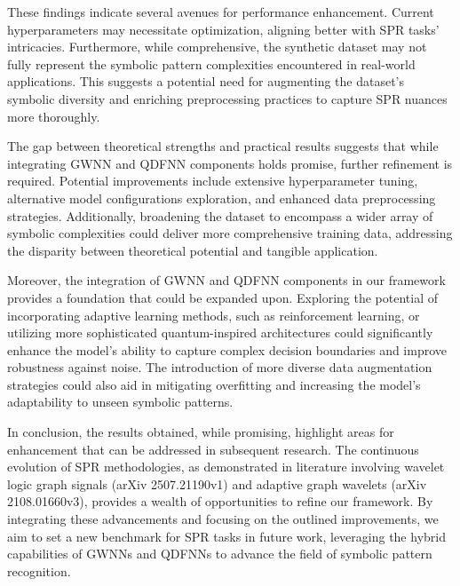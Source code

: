 \documentclass{article}
\begin{document}
These findings indicate several avenues for performance enhancement. Current hyperparameters may necessitate optimization, aligning better with SPR tasks' intricacies. Furthermore, while comprehensive, the synthetic dataset may not fully represent the symbolic pattern complexities encountered in real-world applications. This suggests a potential need for augmenting the dataset's symbolic diversity and enriching preprocessing practices to capture SPR nuances more thoroughly.

The gap between theoretical strengths and practical results suggests that while integrating GWNN and QDFNN components holds promise, further refinement is required. Potential improvements include extensive hyperparameter tuning, alternative model configurations exploration, and enhanced data preprocessing strategies. Additionally, broadening the dataset to encompass a wider array of symbolic complexities could deliver more comprehensive training data, addressing the disparity between theoretical potential and tangible application.

Moreover, the integration of GWNN and QDFNN components in our framework provides a foundation that could be expanded upon. Exploring the potential of incorporating adaptive learning methods, such as reinforcement learning, or utilizing more sophisticated quantum-inspired architectures could significantly enhance the model's ability to capture complex decision boundaries and improve robustness against noise. The introduction of more diverse data augmentation strategies could also aid in mitigating overfitting and increasing the model's adaptability to unseen symbolic patterns.

In conclusion, the results obtained, while promising, highlight areas for enhancement that can be addressed in subsequent research. The continuous evolution of SPR methodologies, as demonstrated in literature involving wavelet logic graph signals (arXiv 2507.21190v1) and adaptive graph wavelets (arXiv 2108.01660v3), provides a wealth of opportunities to refine our framework. By integrating these advancements and focusing on the outlined improvements, we aim to set a new benchmark for SPR tasks in future work, leveraging the hybrid capabilities of GWNNs and QDFNNs to advance the field of symbolic pattern recognition.



\end{document}
